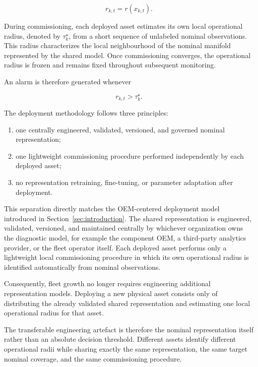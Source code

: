 \documentclass[numbered]{trbunofficial}
\begin{document}
\begin{equation}
r_{k,t}=r(x_{k,t}).
\label{eq:score}
\end{equation}

During commissioning, each deployed asset estimates its own local
operational radius, denoted by $\tau_k^\star$, from a short sequence of
unlabeled nominal observations. This radius characterizes the local
neighbourhood of the nominal manifold represented by the shared model.
Once commissioning converges, the operational radius is frozen and remains
fixed throughout subsequent monitoring.

An alarm is therefore generated whenever

\begin{equation}
r_{k,t}>\tau_k^\star.
\label{eq:decision}
\end{equation}

The deployment methodology follows three principles:

\begin{enumerate}[leftmargin=1.5em]
\item one centrally engineered, validated, versioned, and governed nominal representation;
\item one lightweight commissioning procedure performed independently by each deployed asset;
\item no representation retraining, fine-tuning, or parameter adaptation after deployment.
\end{enumerate}

This separation directly matches the OEM-centered deployment model introduced
in Section~\ref{sec:introduction}. The shared representation is engineered,
validated, versioned, and maintained centrally by whichever organization
owns the diagnostic model, for example the component OEM, a third-party
analytics provider, or the fleet operator itself. Each deployed asset
performs only a lightweight local commissioning procedure in which its own
operational radius is identified automatically from nominal observations.

Consequently, fleet growth no longer requires engineering additional
representation models. Deploying a new physical asset consists only of
distributing the already validated shared representation and estimating one
local operational radius for that asset.

The transferable engineering artefact is therefore the nominal
representation itself rather than an absolute decision threshold.
Different assets identify different operational radii while sharing exactly
the same representation, the same target nominal coverage, and the same
commissioning procedure.
\end{document}
